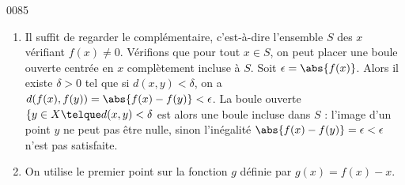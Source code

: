 
\begin{corrige}{0085}

\begin{enumerate}
\item
 Il suffit de regarder le complémentaire, c'est-à-dire l'ensemble $S$ des $x$ vérifiant $f(x) \neq 0$. Vérifions que pour tout $x\in S$, on peut placer une boule ouverte centrée en $x$ complètement incluse à $S$.  Soit $\epsilon = \abs{f(x)}$. Alors il existe $\delta > 0$ tel que si $d(x,y) < \delta$, on a $d(f(x),f(y)) = \abs{f(x) - f(y)} < \epsilon$. La boule ouverte $\{y \in X \telque d(x,y) < \delta$ est alors une boule incluse dans $S$ : l'image d'un point $y$ ne peut pas être nulle, sinon l'inégalité $\abs{f(x) - f(y)} = \epsilon < \epsilon$ n'est pas satisfaite.

\item On utilise le premier point sur la fonction $g$ définie par $g(x) = f(x) - x$.
\end{enumerate}


\end{corrige}
